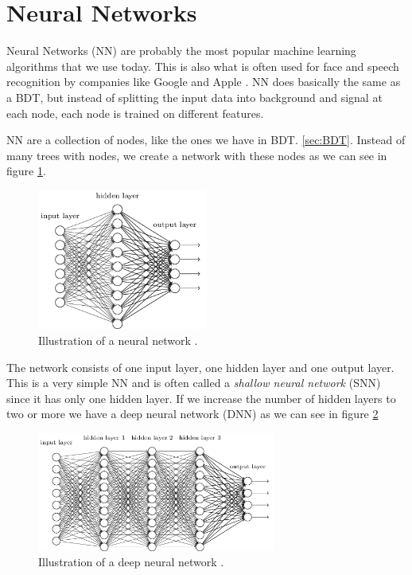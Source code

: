 \section{Neural Networks}
\label{sec:NN}
Neural Networks (NN) are probably the most popular machine learning algorithms that we use today. This is also what is often used for face and speech recognition by companies like Google and Apple \cite{NNarticle}. NN does basically the same as a BDT, but instead of splitting the input data into background and signal at each node, each node is trained on different features. 

NN are a collection of nodes, like the ones we have in BDT. \ref{sec:BDT}. Instead of many trees with nodes, we create a network with these nodes as we can see in figure \ref{fig:NN}. 


\begin{figure}[H]
    \centering
    \includegraphics[width = 0.5\textwidth]{Figures/FromOnline/tikz35.png}
    \caption{Illustration of a neural network \cite{NNpic}.}
    \label{fig:NN}
\end{figure}

The network consists of one input layer, one hidden layer and one output layer. This is a very simple NN and is often called a \textit{shallow neural network} (SNN) since it has only one hidden layer. If we increase the number of hidden layers to two or more we have a deep neural network (DNN) as we can see in figure \ref{fig:DNN}

\begin{figure}[H]
    \centering
    \includegraphics[width = 0.7\textwidth]{Figures/FromOnline/tikz36.png}
    \caption{Illustration of a deep neural network \cite{NNpic}.}
    \label{fig:DNN}
\end{figure}

